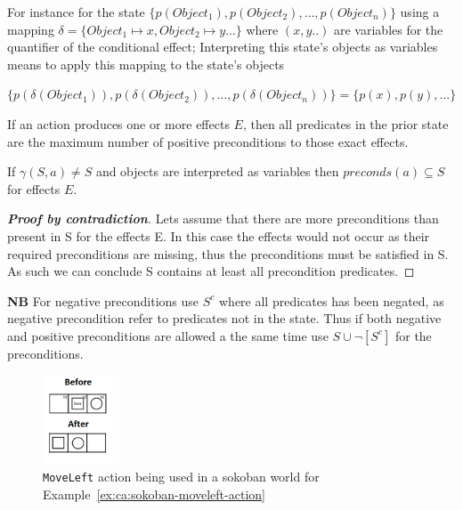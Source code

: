 \documentclass[../Master.tex]{subfiles}
\begin{document}
For instance for the state
$\{ p(Object_1), p(Object_2),\ldots,p(Object_n)\}$ using a mapping
$\delta = \{Object_1 \mapsto x, Object_2 \mapsto y \ldots\}$
where $(x, y..)$ are variables for the quantifier of the conditional effect; Interpreting this state's objects as variables means to apply this mapping to the state's objects

$\{ p(\delta(Object_1)), p(\delta(Object_2)),\ldots,p(\delta(Object_n))\} = \{ p(x), p(y),\ldots\}$

\begin{theorem}\label{thm:ca:precondition-state}
If an action produces one or more effects $E$, then all predicates in the prior state are the maximum number of positive preconditions to those exact effects.

If $\gamma (S,a) \neq S$ and objects are interpreted as variables then $preconds(a) \subseteq S$  for effects $E$.

\begin{proof}[\textbf{Proof by contradiction}] Lets assume that there are more preconditions than present in S for the effects E.
	In this case the effects would not occur as their required preconditions are missing, thus the preconditions must be satisfied in S.
	As such we can conclude S contains at least all precondition predicates.    \qedhere
\end{proof}
\end{theorem}

\textbf{NB} For negative preconditions use $S^c$ where all predicates has been negated, as negative precondition refer to predicates not in the state.
Thus if both negative and positive preconditions are allowed a the same time use  $S \cup \neg[S^c] $ for the preconditions.

\begin{figure}
	\centering
	\includegraphics[width=0.2\textwidth]{../Graphics/soko_cond_example.png}

	\caption{\label{fig:ca:sokoban-moveleft-action}\texttt{MoveLeft} action being used in a sokoban world for Example~\ref{ex:ca:sokoban-moveleft-action} }

\end{figure}
\end{document}
